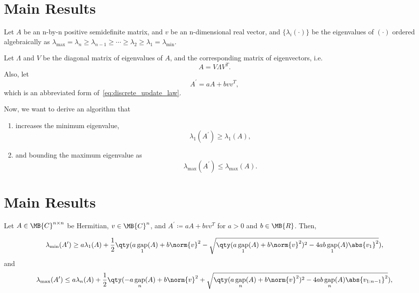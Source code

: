\documentclass[nobib]{my-handout}
\DeclareMathOperator{\gap}{gap}
\begin{document}
\section{Main Results}

Let $A$ be an n-by-n positive semidefinite matrix, and $v$ be an
n-dimensional real vector, and $\{\lambda_i(\cdot)\}$ be the eigenvalues
of $(\cdot)$ ordered algebraically as $\lambda_{\max} = \lambda_n \ge
\lambda_{n-1} \ge \cdots \ge \lambda_2 \ge \lambda_1 = \lambda_{\min}$.

Let $\Lambda$ and $V$ be the diagonal matrix of eigenvalues of $A$, and the
corresponding matrix of eigenvectors, i.e.
\begin{equation*}
	A = V \Lambda V^T.
\end{equation*}
Also, let
\begin{equation*}
	A^\prime = a A + b v v^T,
\end{equation*}
which is an abbreviated form of~\eqref{eq:discrete_update_law}.
	
Now, we want to derive an algorithm that
\begin{enumerate}
	\item increases the minimum eigenvalue,
		\begin{equation*}
			\lambda_1 (A^\prime) \ge \lambda_1 (A),
		\end{equation*}
	\item and bounding the maximum eigenvalue as
		\begin{equation*}
			\lambda_{\max}(A^\prime) \le \lambda_{\max}(A).
		\end{equation*}
\end{enumerate}


\section{Main Results}

\begin{lemma}\label{lem:ipsen_eigenvalue_bounds}
	Let $A \in \MB{C}^{n \times n}$ be Hermitian, $v \in \MB{C}^n$, and $A^\prime
	\coloneqq a A + b v v^T$ for $a > 0$ and $ b \in \MB{R}$. Then,
	\begin{fullwidth}
		\begin{equation}
			\lambda_{\min}(A^\prime)
			\ge a \lambda_1(A) + \frac{1}{2} \qty(a \gap_1(A) + b \norm{v}^2 -
			\sqrt{\qty(a \gap_1(A) + b \norm{v}^2)^2 - 4 a b \gap_1(A) \abs{v_1}^2}),
		\end{equation}
		and
		\begin{equation}
			\lambda_{\max}(A^\prime)
			\le a \lambda_n(A) + \frac{1}{2} \qty(- a \gap_n(A) + b \norm{v}^2 
			+ \sqrt{\qty(a \gap_n(A) + b \norm{v}^2)^2 - 4 a b \gap_n(A)
			\abs{v_{1:n-1}}^2}),
		\end{equation}
	\end{fullwidth}
	\end{lemma}
\end{document}
